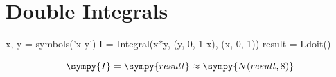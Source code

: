 \documentclass{article}
\begin{document}
\section{Double Integrals}
\begin{sympycode}
x, y = symbols('x y')
I = Integral(x*y, (y, 0, 1-x), (x, 0, 1))
result = I.doit()
\end{sympycode}
\[
\sympy{I} = \sympy{result} \approx \sympy{N(result, 8)}
\]
\end{document}
